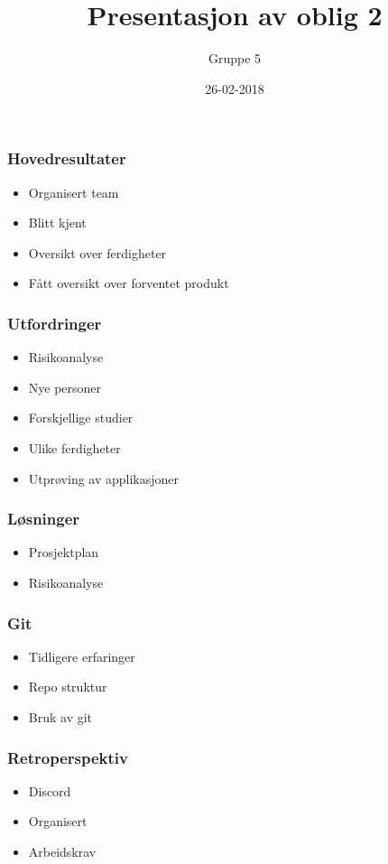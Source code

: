 \documentclass{beamer}
\title{Presentasjon av oblig 2}
\author{Gruppe 5}
\date{26-02-2018}
\begin{document}
\frame{\titlepage}
 
\begin{frame}
    \frametitle{Hovedresultater}
        \begin{itemize}
            \item Organisert team
            \item Blitt kjent
            \item Oversikt over ferdigheter
            \item Fått oversikt over forventet produkt
        \end{itemize}
    \end{frame}
    
    \begin{frame}
    \frametitle{Utfordringer}
        \begin{itemize}
          \item Risikoanalyse
          \item Nye personer
          \item Forskjellige studier
          \item Ulike ferdigheter
          \item Utprøving av applikasjoner
        \end{itemize}
    \end{frame}
    
    \begin{frame}
    \frametitle{Løsninger}
        \begin{itemize}
          \item Prosjektplan
          \item Risikoanalyse
        \end{itemize}
    \end{frame}
    
    \begin{frame}
    \frametitle{Git}
        \begin{itemize}
          \item Tidligere erfaringer
          \item Repo struktur
          \item Bruk av git
        \end{itemize}
    \end{frame}
    
    \begin{frame}
    \frametitle{Retroperspektiv}
        \begin{itemize}
          \item Discord
          \item Organisert
          \item Arbeidskrav
        \end{itemize}
    \end{frame}
    
\end{document}
